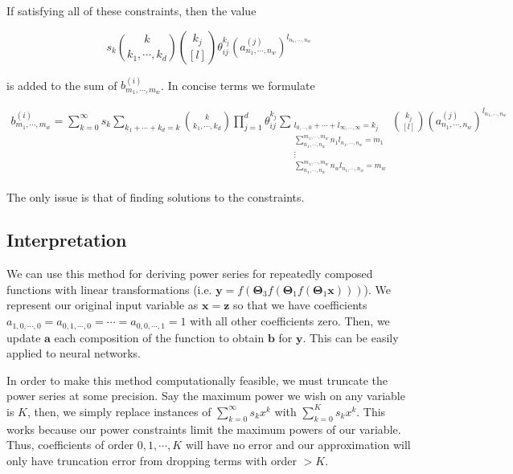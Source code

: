 If satisfying all of these constraints, then the value

\begin{equation*}
    s_k \binom{k}{k_1, \cdots, k_d} \binom{k_j}{[l]} \theta_{ij}^{k_j} (a^{(j)}_{n_1, \cdots, n_w})^{l_{n_1, \cdots, n_w}}
\end{equation*}

is added to the sum of $b^{(i)}_{m_1, \cdots, m_w}$. In concise terms we formulate

\begin{align*}
    b^{(i)}_{m_1, \cdots, m_w} = \sum_{k=0}^{\infty} s_k \sum_{k_1 + \cdots + k_d = k} \binom{k}{k_1, \cdots, k_d} \prod_{j=1}^{d} \theta_{ij}^{k_j} \sum_{\substack{l_{0, \cdots, 0} + \cdots + l_{\infty, \cdots, \infty} = k_j \\ \sum_{n_1, \cdots, n_w}^{m_1, \cdots, m_w} n_1 l_{n_1, \cdots, n_w} = m_1 \\ \vdots \\ \sum_{n_1, \cdots, n_w}^{m_1, \cdots, m_w} n_w l_{n_1, \cdots, n_w} = m_w}} \binom{k_j}{[l]} (a^{(j)}_{n_1, \cdots, n_w})^{l_{n_1, \cdots, n_w}}
\end{align*}

The only issue is that of finding solutions to the constraints.

\subsection{Interpretation}

We can use this method for deriving power series for repeatedly composed functions with linear transformations (i.e. $\mathbf{y} = f(\mathbf{\Theta}_3 f(\mathbf{
\Theta}_1 f(\mathbf{\Theta}_1 \mathbf{x})))$). We represent our original input variable as $\mathbf{x} = \mathbf{z}$ so that we have coefficients $a_{1, 0, \cdots, 0} = a_{0, 1, \cdots, 0} = \cdots = a_{0, 0, \cdots, 1} = 1$ with all other coefficients zero. Then, we update $\mathbf{a}$ each composition of the function to obtain $\mathbf{b}$ for $\mathbf{y}$. This can be easily applied to neural networks.

\vspace{0.10in}
\noindent
In order to make this method computationally feasible, we must truncate the power series at some precision. Say the maximum power we wish on any variable is $K$, then, we simply replace instances of $\sum_{k=0}^{\infty} s_k x^k$ with $\sum_{k=0}^{K} s_k x^k$. This works because our power constraints limit the maximum powers of our variable. Thus, coefficients of order $0, 1, \cdots, K$ will have no error and our approximation will only have truncation error from dropping terms with order $> K$.

